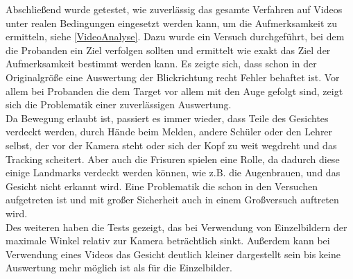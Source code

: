 Abschließend wurde getestet, wie zuverlässig das gesamte Verfahren auf Videos unter realen Bedingungen eingesetzt werden kann, um die Aufmerksamkeit zu ermitteln, siehe \autoref{VideoAnalyse}. Dazu wurde ein Versuch durchgeführt, bei dem die Probanden ein Ziel verfolgen sollten und ermittelt wie exakt das Ziel der Aufmerksamkeit bestimmt werden kann. Es zeigte sich, dass schon in der Originalgröße eine Auswertung der Blickrichtung recht Fehler behaftet ist. Vor allem bei Probanden die dem Target vor allem mit den Auge gefolgt sind, zeigt sich die Problematik einer zuverlässigen Auswertung.\\
Da Bewegung erlaubt ist, passiert es immer wieder, dass Teile des Gesichtes verdeckt werden, durch Hände beim Melden, andere Schüler oder den Lehrer selbst, der vor der Kamera steht oder sich der Kopf zu weit wegdreht und das Tracking scheitert. Aber auch die Frisuren spielen eine Rolle, da dadurch diese einige Landmarks verdeckt werden können, wie z.B. die Augenbrauen, und das Gesicht nicht erkannt wird. Eine Problematik die schon in den Versuchen aufgetreten ist und mit großer Sicherheit auch in einem Großversuch auftreten wird.\\
Des weiteren haben die Tests gezeigt, das bei Verwendung von Einzelbildern der maximale Winkel relativ zur Kamera beträchtlich sinkt. Außerdem kann bei Verwendung eines Videos das Gesicht deutlich kleiner dargestellt sein bis keine Auswertung mehr möglich ist als für die Einzelbilder.

